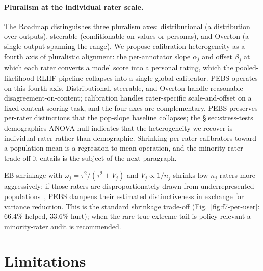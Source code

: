 \documentclass{article}
\newcommand{\PEBS}{\textsc{PEBS}}
\begin{document}
\paragraph{Pluralism at the individual rater scale.}
The \citet{sorensen2024roadmap} Roadmap distinguishes three
pluralism axes: distributional (a distribution over outputs),
steerable (conditionable on values or personas), and Overton (a
single output spanning the range). We propose calibration
heterogeneity as a fourth axis of pluralistic alignment: the
per-annotator slope $\alpha_j$ and offset $\beta_j$ at which each
rater converts a model score into a personal rating, which the
pooled-likelihood RLHF pipeline collapses into a single global
calibrator. \PEBS{} operates on this fourth axis. Distributional,
steerable, and Overton handle reasonable-disagreement-on-content;
calibration handles rater-specific scale-and-offset on a
fixed-content scoring task, and the four axes are complementary.
\PEBS{} preserves per-rater distinctions that the pop-slope
baseline collapses; the
\S\ref{sec:stress-tests} demographics-ANOVA null indicates that the
heterogeneity we recover is individual-rater rather than
demographic. Shrinking per-rater calibrators toward a population
mean is a regression-to-mean operation, and the minority-rater
trade-off it entails is the subject of the next paragraph.

EB shrinkage with $\omega_j = \tau^2 / (\tau^2 + V_j)$ and
$V_j \propto 1/n_j$ shrinks low-$n_j$ raters more aggressively;
if those raters are disproportionately drawn from underrepresented
populations~\citep{kirk2024prism}, PEBS dampens their estimated
distinctiveness in exchange for variance reduction. This is the
standard shrinkage trade-off (Fig.~\ref{fig:f7-per-user}:
$66.4\%$ helped, $33.6\%$ hurt); when the rare-true-extreme tail
is policy-relevant a minority-rater audit is recommended.

\section{Limitations}\label{sec:limitations}
\end{document}
